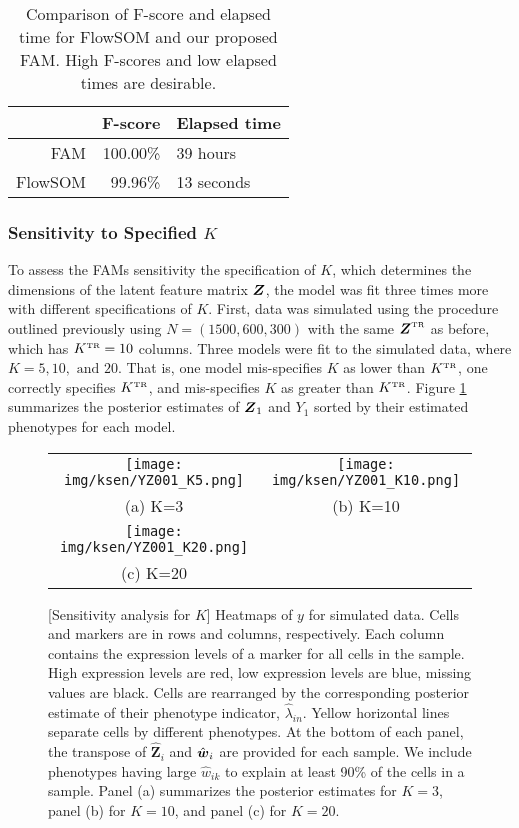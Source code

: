 \documentclass[12pt,]{article}
\def\Z{\bm{Z}}
\newcommand{\true}{{\mbox{\tiny TR}}}
\newcommand{\bZ}{\mbox{\boldmath $Z$}}
\newcommand{\bw}{\mbox{\boldmath $w$}}
\begin{document}
\begin{table}[H]
\centering
\begin{tabular}{rrl}
  \hline
  & F-score & Elapsed time \\
  \hline
  FAM & 100.00\% & 39 hours \\
  FlowSOM & 99.96\% & 13 seconds \\
  \hline
\end{tabular}
\label{tab:fscores}
\caption{Comparison of F-score and elapsed time for FlowSOM and our proposed
FAM. High F-scores and low elapsed times are desirable.}
\end{table}


\subsubsection{Sensitivity to Specified $K$}\label{sec:ksens}
To assess the FAMs sensitivity the specification of $K$, which determines the
dimensions of the latent feature matrix $\bZ$, the model was fit three times
more with different specifications of $K$. First, data was simulated using the
procedure outlined previously using $N=(1500, 600, 300)$ with the same
$\bZ^\true$ as before, which has $K^\true=10$ columns. Three models were fit to
the simulated data, where $K=5, 10, \text{ and } 20$. That is, one model
mis-specifies $K$ as lower than $K^\true$, one correctly specifies $K^\true$,
and mis-specifies $K$ as greater than $K^\true$.
Figure \ref{fig:ksen-post-Z} summarizes the posterior estimates of $\bZ_1$
and $Y_1$ sorted by their estimated phenotypes for each model.
\begin{figure}%
\begin{center}
  \begin{tabular}{cc}
  \texttt{[image: img/ksen/YZ001\_K5.png]}&
  \texttt{[image: img/ksen/YZ001\_K10.png]}\\
  {\small (a) K=3} & {\small (b) K=10} \\
  \texttt{[image: img/ksen/YZ001\_K20.png]}& \\
  {\small (c) K=20} &\\
  \end{tabular}
  \vspace{-0.05in}
  \caption{\small[Sensitivity analysis for $K$] Heatmaps of $y$ for simulated
    data. Cells and markers are in rows and columns, respectively. Each column
    contains the expression levels of a marker for all cells in the sample.
    High expression levels are red, low expression levels are blue, missing
    values are black.  Cells are rearranged by the corresponding posterior
    estimate of their phenotype indicator, $\hat{\lambda}_{in}$.  Yellow
    horizontal lines separate cells by different phenotypes.  At the bottom of
    each panel, the transpose of $\hat{\Z}_i$ and $\hat{\bw}_i$ are provided
    for each sample.  We include phenotypes having large $\hat{w}_{ik}$ to
    explain at least 90\% of the cells in a sample. Panel (a) summarizes
    the posterior estimates for $K=3$, panel (b) for $K=10$, and panel (c)
    for $K=20$.}
  \label{fig:ksen-post-Z}
\end{center}
\end{figure}
\end{document}
